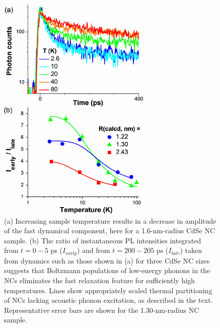 \begin{figure}
\begin{center}
\includegraphics[width=0.65\textwidth]{./Chapter4/trpl4.png}
\caption[Temperature dependent decay of high energy PL from CdSe nanocrystals.]{(a) Increasing sample temperature results in a decrease in amplitude of the fast dynamical component, here for a 1.6-nm-radius CdSe NC sample. (b) The ratio of instantaneous PL intensities integrated from $t = 0 - 5$ ps ($I_{early}$) and from $t = 200 - 205$ ps ($I_{late}$) taken from dynamics such as those shown in (a) for three CdSe NC sizes suggests that Boltzmann populations of low-energy phonons in the NCs eliminates the fast relaxation feature for sufficiently high temperatures. Lines show appropriately scaled thermal partitioning of NCs lacking acoustic phonon excitation, as described in the text. Representative error bars are shown for the 1.30-nm-radius NC sample.}
\label{f:trpl4}
\end{center}
\end{figure}

